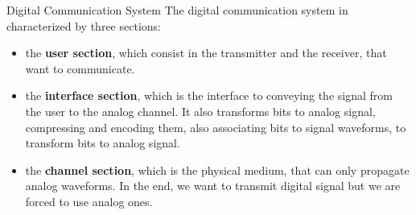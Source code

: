 \begin{section}{Digital Communication System}
The digital communication system in characterized by three sections: 

\begin{itemize}
  \item the \textbf{user section}, which consist in the transmitter and the receiver, that want to 
    communicate. 
  \item the \textbf{interface section}, which is the interface to conveying the signal from the 
    user to the analog channel. It also transforms bits to analog signal, compressing and encoding 
    them, also associating bits to signal waveforms, to transform bits to analog signal.
  \item the \textbf{channel section}, which is the physical medium, that can only propagate analog 
    waveforms. In the end, we want to transmit digital signal but we are forced to use analog ones.
\end{itemize}


\end{section}
